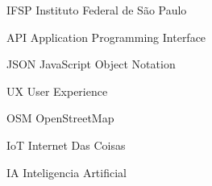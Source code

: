 
\begin{siglas}
    \item[IFSP] Instituto Federal de São Paulo
    \item[API] Application Programming Interface
    \item[JSON] JavaScript Object Notation
    \item[UX] User Experience
    \item[OSM] OpenStreetMap
    \item[IoT] Internet Das Coisas
    \item[IA] Inteligencia Artificial
\end{siglas}

